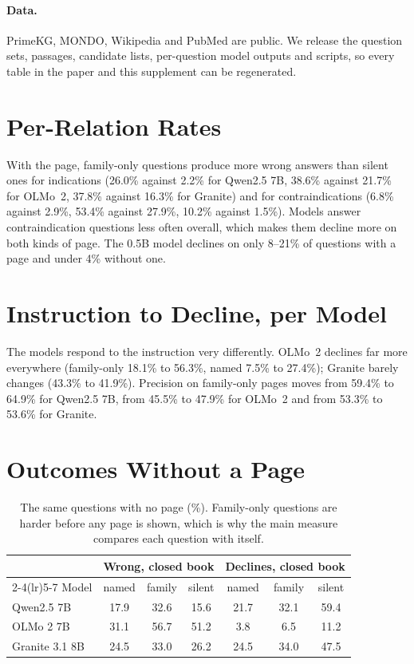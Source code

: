 \documentclass[letterpaper]{article} %
\begin{document}
\paragraph{Data.}
PrimeKG, MONDO, Wikipedia and PubMed are public. We release the question sets,
passages, candidate lists, per-question model outputs and scripts, so every
table in the paper and this supplement can be regenerated.



\section{Per-Relation Rates}

With the page, family-only questions produce more wrong answers than silent
ones for indications (26.0\% against 2.2\% for Qwen2.5 7B, 38.6\% against
21.7\% for OLMo~2, 37.8\% against 16.3\% for Granite) and for
contraindications (6.8\% against 2.9\%, 53.4\% against 27.9\%, 10.2\% against
1.5\%). Models answer contraindication questions less often overall, which
makes them decline more on both kinds of page. The 0.5B model declines on only
8--21\% of questions with a page and under 4\% without one.

\section{Instruction to Decline, per Model}

The models respond to the instruction very differently. OLMo~2 declines far
more everywhere (family-only 18.1\% to 56.3\%, named 7.5\% to 27.4\%);
Granite barely changes (43.3\% to 41.9\%). Precision on family-only pages
moves from 59.4\% to 64.9\% for Qwen2.5 7B, from 45.5\% to 47.9\% for OLMo~2
and from 53.3\% to 53.6\% for Granite.

\section{Outcomes Without a Page}

\begin{table}[h]
\centering
\small
\setlength{\tabcolsep}{3pt}
\begin{tabular}{lcccccc}
\toprule
 & \multicolumn{3}{c}{Wrong, closed book} & \multicolumn{3}{c}{Declines, closed book} \\
\cmidrule(lr){2-4}\cmidrule(lr){5-7}
Model & named & family & silent & named & family & silent \\
\midrule
Qwen2.5 7B & 17.9 & 32.6 & 15.6 & 21.7 & 32.1 & 59.4 \\
OLMo 2 7B & 31.1 & 56.7 & 51.2 & 3.8 & 6.5 & 11.2 \\
Granite 3.1 8B & 24.5 & 33.0 & 26.2 & 24.5 & 34.0 & 47.5 \\
\bottomrule
\end{tabular}
\caption{The same questions with no page (\%). Family-only questions are
harder before any page is shown, which is why the main measure compares each
question with itself.}
\label{tab:closed}
\end{table}
\end{document}
